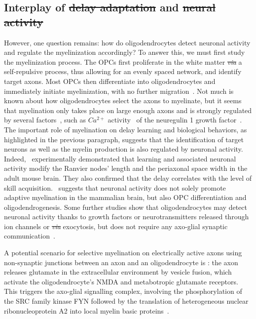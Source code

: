 \documentclass[brainsci, %
               review,accept,pdftex,moreauthors %
               ]{Definitions/mdpi}
\providecommand{\DIFadd}[1]{{\protect\color{blue}\uwave{#1}}} %
\providecommand{\DIFdel}[1]{{\protect\color{red}\sout{#1}}}                      %
\providecommand{\DIFaddbegin}{} %
\providecommand{\DIFaddend}{} %
\providecommand{\DIFdelbegin}{} %
\providecommand{\DIFdelend}{} %
\newcommand{\DIFscaledelfig}{0.5}
\newlength{\DIFdelgraphicswidth} %
\newlength{\DIFdelgraphicsheight} %
\newcommand{\DIFaddincludegraphics}[2][]{{\color{blue}\fbox{\DIFOincludegraphics[#1]{#2}}}} %
\newcommand{\DIFdelincludegraphics}[2][]{%
\sbox{\DIFdelgraphicsbox}{\DIFOincludegraphics[#1]{#2}}%
\settoboxwidth{\DIFdelgraphicswidth}{\DIFdelgraphicsbox} %
\settoboxtotalheight{\DIFdelgraphicsheight}{\DIFdelgraphicsbox} %
\scalebox{\DIFscaledelfig}{%
\parbox[b]{\DIFdelgraphicswidth}{\usebox{\DIFdelgraphicsbox}\\[-\baselineskip] \rule{\DIFdelgraphicswidth}{0em}}\llap{\resizebox{\DIFdelgraphicswidth}{\DIFdelgraphicsheight}{%
\setlength{\unitlength}{\DIFdelgraphicswidth}%
\begin{picture}(1,1)%
\thicklines\linethickness{2pt} %
{\color[rgb]{1,0,0}\put(0,0){\framebox(1,1){}}}%
{\color[rgb]{1,0,0}\put(0,0){\line( 1,1){1}}}%
{\color[rgb]{1,0,0}\put(0,1){\line(1,-1){1}}}%
\end{picture}%
}\hspace*{3pt}}} %
} %
\DeclareRobustCommand{\DIFaddbegin}{\DIFOaddbegin \let\includegraphics\DIFaddincludegraphics} %
\DeclareRobustCommand{\DIFaddend}{\DIFOaddend \let\includegraphics\DIFOincludegraphics} %
\DeclareRobustCommand{\DIFdelbegin}{\DIFOdelbegin \let\includegraphics\DIFdelincludegraphics} %
\DeclareRobustCommand{\DIFdelend}{\DIFOaddend \let\includegraphics\DIFOincludegraphics} %
\begin{document}
\subsection{Interplay of \DIFdelbegin \DIFdel{delay adaptation }\DIFdelend \DIFaddbegin \DIFadd{Delay Adaptation }\DIFaddend and \DIFdelbegin \DIFdel{neural activity}\DIFdelend \DIFaddbegin \DIFadd{Neural Activity}\DIFaddend }
However, one question remains: how do oligodendrocytes detect neuronal activity and regulate the myelinization accordingly? To answer this, we must first study the myelinization process. The OPCs first proliferate in the white matter \DIFdelbegin \emph{\DIFdel{via}} %
\DIFdelend \DIFaddbegin \textit{\DIFadd{via}} \DIFaddend a self-repulsive process, thus allowing for an evenly spaced network, and identify target axons. Most OPCs then differentiate into oligodendrocytes and immediately initiate myelinization, with no further migration~\citep{simons_oligodendrocytes_2016}. Not much is known about how oligodendrocytes select the axons to myelinate, but it seems that myelination only takes place on large enough axons and is strongly regulated by several factors~\citep{kuhn_oligodendrocytes_2019}, such as \DIFdelbegin \DIFdel{$Ca^{2+}$ }\DIFdelend \DIFaddbegin \DIFadd{Ca$^{2+}$ }\DIFaddend activity~\citep{baraban_ca2_2018} of the neuregulin 1 growth factor~\citep{nave_axonal_2006}. The important role of myelination on delay learning and biological behaviors, as highlighted in the previous paragraph, suggests that the identification of target neurons as well as the myelin production is also regulated by neuronal activity. Indeed,~\citet{cullen_periaxonal_2021} experimentally demonstrated that learning and associated neuronal activity modify the Ranvier nodes' length and the periaxonal space width in the adult mouse brain. They also confirmed that the delay correlates with the level of skill acquisition.~\citet{gibson_neuronal_2014} suggests that neuronal activity does not solely promote adaptive myelination in the mammalian brain, but also OPC differentiation and oligodendrogenesis. Some further studies show that oligodendrocytes may detect neuronal activity thanks to growth factors or neurotransmitters released through ion channels or \DIFdelbegin \emph{\DIFdel{via}} %
\DIFdelend \DIFaddbegin {\DIFadd{via}} \DIFaddend exocytosis, but does not require any axo-glial synaptic communication~\citep{fields_new_2015}. 

A potential scenario for selective myelination on electrically active axons using non-synaptic junctions between an axon and an oligodendrocyte is \DIFaddbegin \DIFadd{as follows}\DIFaddend : the axon releases glutamate in the extracellular environment by vesicle fusion, which activate the oligodendrocyte's NMDA and metabotropic glutamate receptors. This triggers the axo-glial signalling complex, involving the phosphorylation of the SRC family kinase FYN followed by the translation of heterogeneous nuclear ribonucleoprotein A2 into local myelin basic proteins~\citep{fields_new_2015}.
\end{document}
